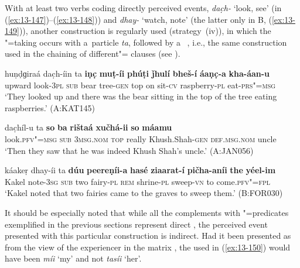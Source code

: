  With at least two verbs coding directly perceived events, \textit{dac̣h-} `look, see' (in (\ref{ex:13-147})--(\ref{ex:13-148})) and \textit{dhay-} `watch, note' (the latter only in B, (\ref{ex:13-149})), another construction is regularly used (strategy~(iv)), in which the  "=taking  occurs with a~particle \textit{ta}, followed by a~ , i.e., the same construction used in the chaining of different"= clauses (see ). 

\begin{exe}
\ex
\label{ex:13-147}
\gll huṇḍɡiraá dac̣h-íin ta \textbf{iṇc̣} \textbf{muṭ-íi} \textbf{phúṭi} \textbf{ǰhulí} \textbf{bheš-í} \textbf{áaṇc̣-a} \textbf{kha-áan-u}\\
upward look-\textsc{3pl} \textsc{sub} bear tree-\textsc{gen} top on sit-\textsc{cv} raspberry-\textsc{pl} eat-\textsc{prs"=msg}\\
\glt `They looked up and there was the bear sitting in the top of the tree eating raspberries.' (A:KAT145)

\ex
\label{ex:13-148}
\gll dac̣híl-u ta \textbf{so} \textbf{ba} \textbf{rištaá} \textbf{xučhá-ii} \textbf{so} \textbf{máamu}\\
look.\textsc{pfv"=msg} \textsc{sub} \textsc{3msg.nom} \textsc{top} really Khush.Shah-\textsc{gen} \textsc{def.msg.nom} uncle\\
\glt `Then they saw that he was indeed Khush Shah's uncle.' (A:JAN056)

\ex
\label{ex:13-149}
\gll káakeṛ dhay-íi ta \textbf{dúu} \textbf{peereṇíi-a} \textbf{hasé} \textbf{ziaarat-í} \textbf{pičha-aníi} \textbf{the} \textbf{yéel-im}\\
Kakel note-\textsc{3sg} \textsc{sub} two fairy-\textsc{pl}  \textsc{rem} shrine-\textsc{pl} sweep-\textsc{vn} to come.\textsc{pfv"=fpl}\\
\glt `Kakel noted that two fairies came to the graves to sweep them.' (B:FOR030) 
\end{exe}

It should be especially noted that while all the complements with "=predicates exemplified in the previous sections represent direct , the perceived event presented with this particular construction is indirect. Had it been presented as from the view of the experiencer in the matrix , the  used in (\ref{ex:13-150}) would have been \textit{míi} `my' and not \textit{tasíi} `her'.

